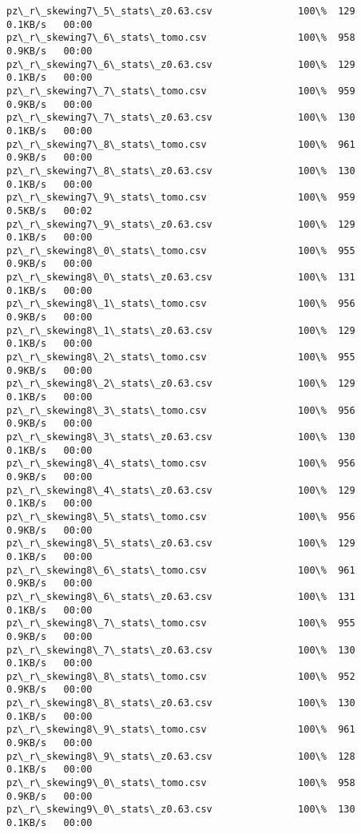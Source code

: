 \documentclass[11pt]{article}
\begin{document}
\begin{Verbatim}[commandchars=\\\{\}]
pz\_r\_skewing7\_5\_stats\_z0.63.csv               100\%  129     0.1KB/s   00:00    
pz\_r\_skewing7\_6\_stats\_tomo.csv                100\%  958     0.9KB/s   00:00    
pz\_r\_skewing7\_6\_stats\_z0.63.csv               100\%  129     0.1KB/s   00:00    
pz\_r\_skewing7\_7\_stats\_tomo.csv                100\%  959     0.9KB/s   00:00    
pz\_r\_skewing7\_7\_stats\_z0.63.csv               100\%  130     0.1KB/s   00:00    
pz\_r\_skewing7\_8\_stats\_tomo.csv                100\%  961     0.9KB/s   00:00    
pz\_r\_skewing7\_8\_stats\_z0.63.csv               100\%  130     0.1KB/s   00:00    
pz\_r\_skewing7\_9\_stats\_tomo.csv                100\%  959     0.5KB/s   00:02    
pz\_r\_skewing7\_9\_stats\_z0.63.csv               100\%  129     0.1KB/s   00:00    
pz\_r\_skewing8\_0\_stats\_tomo.csv                100\%  955     0.9KB/s   00:00    
pz\_r\_skewing8\_0\_stats\_z0.63.csv               100\%  131     0.1KB/s   00:00    
pz\_r\_skewing8\_1\_stats\_tomo.csv                100\%  956     0.9KB/s   00:00    
pz\_r\_skewing8\_1\_stats\_z0.63.csv               100\%  129     0.1KB/s   00:00    
pz\_r\_skewing8\_2\_stats\_tomo.csv                100\%  955     0.9KB/s   00:00    
pz\_r\_skewing8\_2\_stats\_z0.63.csv               100\%  129     0.1KB/s   00:00    
pz\_r\_skewing8\_3\_stats\_tomo.csv                100\%  956     0.9KB/s   00:00    
pz\_r\_skewing8\_3\_stats\_z0.63.csv               100\%  130     0.1KB/s   00:00    
pz\_r\_skewing8\_4\_stats\_tomo.csv                100\%  956     0.9KB/s   00:00    
pz\_r\_skewing8\_4\_stats\_z0.63.csv               100\%  129     0.1KB/s   00:00    
pz\_r\_skewing8\_5\_stats\_tomo.csv                100\%  956     0.9KB/s   00:00    
pz\_r\_skewing8\_5\_stats\_z0.63.csv               100\%  129     0.1KB/s   00:00    
pz\_r\_skewing8\_6\_stats\_tomo.csv                100\%  961     0.9KB/s   00:00    
pz\_r\_skewing8\_6\_stats\_z0.63.csv               100\%  131     0.1KB/s   00:00    
pz\_r\_skewing8\_7\_stats\_tomo.csv                100\%  955     0.9KB/s   00:00    
pz\_r\_skewing8\_7\_stats\_z0.63.csv               100\%  130     0.1KB/s   00:00    
pz\_r\_skewing8\_8\_stats\_tomo.csv                100\%  952     0.9KB/s   00:00    
pz\_r\_skewing8\_8\_stats\_z0.63.csv               100\%  130     0.1KB/s   00:00    
pz\_r\_skewing8\_9\_stats\_tomo.csv                100\%  961     0.9KB/s   00:00    
pz\_r\_skewing8\_9\_stats\_z0.63.csv               100\%  128     0.1KB/s   00:00    
pz\_r\_skewing9\_0\_stats\_tomo.csv                100\%  958     0.9KB/s   00:00    
pz\_r\_skewing9\_0\_stats\_z0.63.csv               100\%  130     0.1KB/s   00:00    

\end{Verbatim}
\end{document}
